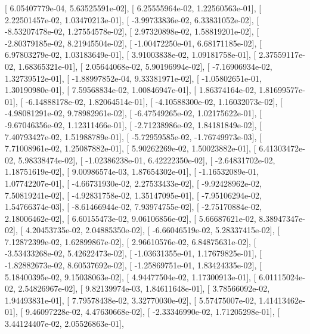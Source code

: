 \documentclass{article}
\begin{document}
       [  6.05407779e-04,   5.63525591e-02],
       [  6.25555964e-02,   1.22560563e-01],
       [  2.22501457e-02,   1.03470213e-01],
       [ -3.99733836e-02,   6.33831052e-02],
       [ -8.53207478e-02,   1.27554578e-02],
       [  2.97320898e-02,   1.58819201e-02],
       [ -2.80379185e-02,   8.21945504e-02],
       [ -1.00472250e-01,   6.68171185e-02],
       [  6.97803279e-02,   1.03183649e-01],
       [  3.91003838e-02,   1.09181758e-01],
       [  2.37559117e-02,   1.68365321e-01],
       [  2.05644068e-02,   5.90196994e-02],
       [ -7.16906934e-02,   1.32739512e-01],
       [ -1.88997852e-04,   9.33381971e-02],
       [ -1.05802651e-01,   1.30190980e-01],
       [  7.59568834e-02,   1.00846947e-01],
       [  1.86374164e-02,   1.81699577e-01],
       [ -6.14888178e-02,   1.82064514e-01],
       [ -4.10588300e-02,   1.16032073e-02],
       [ -4.98081291e-02,   9.78982961e-02],
       [ -6.47549265e-02,   1.02175622e-01],
       [ -9.67046356e-02,   1.12311466e-01],
       [ -2.71238986e-02,   1.84181849e-02],
       [  7.40793427e-02,   1.51988789e-01],
       [ -5.72959585e-02,  -1.76749973e-03],
       [  7.71008961e-02,   1.25087882e-01],
       [  5.90262269e-02,   1.50023882e-01],
       [  6.41303472e-02,   5.98338474e-02],
       [ -1.02386238e-01,   6.42222350e-02],
       [ -2.64831702e-02,   1.18751619e-02],
       [  9.00986574e-03,   1.87654302e-01],
       [ -1.16532089e-01,   1.07742207e-01],
       [ -4.66731930e-02,   2.27533433e-02],
       [ -9.92428962e-02,   7.50819241e-02],
       [ -4.92831758e-02,   1.35147095e-01],
       [ -7.95106294e-02,   1.54766374e-03],
       [ -8.61466944e-02,   7.93974755e-02],
       [ -2.75170884e-02,   2.18006462e-02],
       [  6.60155473e-02,   9.06106856e-02],
       [  5.66687621e-02,   8.38947347e-02],
       [  4.20453735e-02,   2.04885350e-02],
       [ -6.66046519e-02,   5.28337415e-02],
       [  7.12872399e-02,   1.62899867e-02],
       [  2.96610576e-02,   6.84875631e-02],
       [ -3.53433268e-02,   5.42622473e-02],
       [ -1.03631355e-01,   1.17679825e-01],
       [ -1.82882673e-02,   8.60537692e-02],
       [ -1.25869751e-01,   1.83424335e-02],
       [  5.18400395e-02,   9.15038063e-02],
       [  4.94477504e-02,   1.17300913e-01],
       [  6.01115024e-02,   2.54826967e-02],
       [  9.82139974e-03,   1.84611648e-01],
       [  3.78566092e-02,   1.94493831e-01],
       [  7.79578438e-02,   3.32770030e-02],
       [  5.57475007e-02,   1.41413462e-01],
       [  9.46097228e-02,   4.47630668e-02],
       [ -2.33346990e-02,   1.71205298e-01],
       [  3.44124407e-02,   2.05526863e-01],
\end{document}
